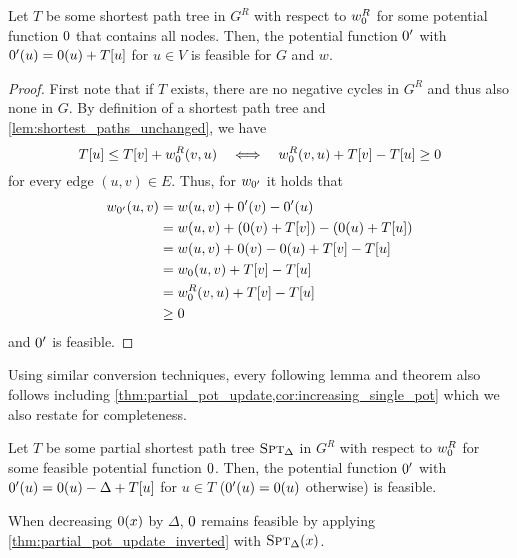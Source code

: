 \begin{lemma}\label{lem:shortest_paths_are_feasible_inverted}
  Let $T$ be some shortest path tree in $G^R$ with respect to $\wpot^R$ for some potential function $\pot$ that contains all nodes.
  Then, the potential function $\pot'$ with $\pot'(u) = \pot(u) + T[u]$ for $u \in V$ is feasible for $G$ and $w$.
\end{lemma}
\begin{proof}
  First note that if $T$ exists, there are no negative cycles in $G^R$ and thus also none in $G$.  
  By definition of a shortest path tree and \cref{lem:shortest_paths_unchanged}, we have \[
    T[u] \leq T[v] + \wpot^R(v, u) \quad\Longleftrightarrow\quad \wpot^R(v, u) + T[v] - T[u] \geq 0
  \] for every edge $(u, v) \in E$.
  Thus, for $w_{\pot'}$ it holds that \begin{align*}
    w_{\pot'}(u, v) &= w(u, v) + \pot'(v) - \pot'(u) \\ 
                    &= w(u, v) + \left(\pot(v) + T[v]\right) - \left(\pot(u) + T[u]\right) \\
                    &= w(u, v) + \pot(v) - \pot(u) + T[v] - T[u] \\
                    &= \wpot(u, v) + T[v] - T[u] \\
                    &= \wpot^R(v, u) + T[v] - T[u] \\
                    &\geq 0
  \end{align*} and $\pot'$ is feasible.
\end{proof}

Using similar conversion techniques, every following lemma and theorem also follows including \cref{thm:partial_pot_update,cor:increasing_single_pot} which we also restate for completeness.

\begin{theorem}\label{thm:partial_pot_update_inverted}
  Let $T$ be some partial shortest path tree $\textsc{Spt}_{\Delta}$ in $G^R$ with respect to $\wpot^R$ for some feasible potential function $\pot$.
  Then, the potential function $\pot'$ with $\pot'(u) = \pot(u) - \Delta + T[u]$ for $u \in T$ ($\pot'(u) = \pot(u)$ otherwise) is feasible. 
\end{theorem}

\begin{corollary}\label{cor:increasing_single_pot_inverted}
  When decreasing $\pot(x)$ by $\Delta$, $\pot$ remains feasible by applying \cref{thm:partial_pot_update_inverted} with $\textsc{Spt}_{\Delta}(x)$.
\end{corollary}

